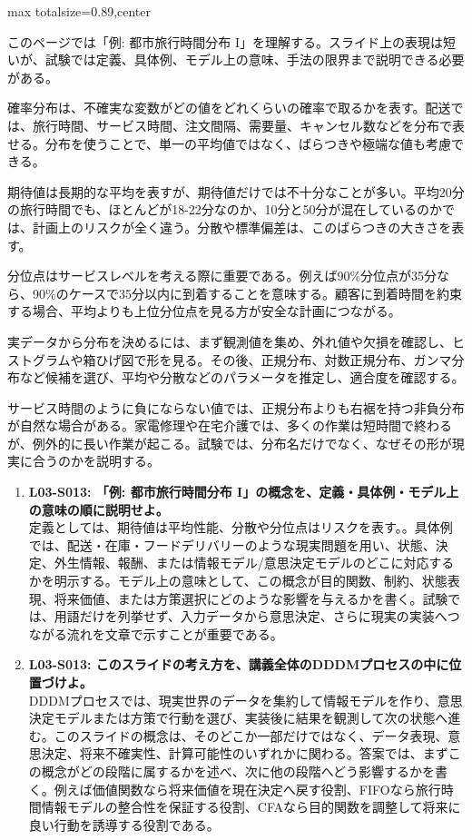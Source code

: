\begin{minipage}[t]{0.58\textwidth}
\begin{adjustbox}{max totalsize={\textwidth}{0.89\textheight},center}
\begin{minipage}{\textwidth}\scriptsize
{}このページでは「例: 都市旅行時間分布 I」を理解する。スライド上の表現は短いが、試験では定義、具体例、モデル上の意味、手法の限界まで説明できる必要がある。\par
確率分布は、不確実な変数がどの値をどれくらいの確率で取るかを表す。配送では、旅行時間、サービス時間、注文間隔、需要量、キャンセル数などを分布で表せる。分布を使うことで、単一の平均値ではなく、ばらつきや極端な値も考慮できる。\par
期待値は長期的な平均を表すが、期待値だけでは不十分なことが多い。平均20分の旅行時間でも、ほとんどが18-22分なのか、10分と50分が混在しているのかでは、計画上のリスクが全く違う。分散や標準偏差は、このばらつきの大きさを表す。\par
分位点はサービスレベルを考える際に重要である。例えば90\%分位点が35分なら、90\%のケースで35分以内に到着することを意味する。顧客に到着時間を約束する場合、平均よりも上位分位点を見る方が安全な計画につながる。\par
実データから分布を決めるには、まず観測値を集め、外れ値や欠損を確認し、ヒストグラムや箱ひげ図で形を見る。その後、正規分布、対数正規分布、ガンマ分布など候補を選び、平均や分散などのパラメータを推定し、適合度を確認する。\par
サービス時間のように負にならない値では、正規分布よりも右裾を持つ非負分布が自然な場合がある。家電修理や在宅介護では、多くの作業は短時間で終わるが、例外的に長い作業が起こる。試験では、分布名だけでなく、なぜその形が現実に合うのかを説明する。\par{}\begin{enumerate}\item \textbf{L03-S013: 「例: 都市旅行時間分布 I」の概念を、定義・具体例・モデル上の意味の順に説明せよ。}\\定義としては、期待値は平均性能、分散や分位点はリスクを表す。。具体例では、配送・在庫・フードデリバリーのような現実問題を用い、状態、決定、外生情報、報酬、または情報モデル/意思決定モデルのどこに対応するかを明示する。モデル上の意味として、この概念が目的関数、制約、状態表現、将来価値、または方策選択にどのような影響を与えるかを書く。試験では、用語だけを列挙せず、入力データから意思決定、さらに現実の実装へつながる流れを文章で示すことが重要である。\item \textbf{L03-S013: このスライドの考え方を、講義全体のDDDMプロセスの中に位置づけよ。}\\DDDMプロセスでは、現実世界のデータを集約して情報モデルを作り、意思決定モデルまたは方策で行動を選び、実装後に結果を観測して次の状態へ進む。このスライドの概念は、そのどこか一部だけではなく、データ表現、意思決定、将来不確実性、計算可能性のいずれかに関わる。答案では、まずこの概念がどの段階に属するかを述べ、次に他の段階へどう影響するかを書く。例えば価値関数なら将来価値を現在決定へ戻す役割、FIFOなら旅行時間情報モデルの整合性を保証する役割、CFAなら目的関数を調整して将来に良い行動を誘導する役割である。\end{enumerate}

\end{minipage}
\end{adjustbox}
\end{minipage}
